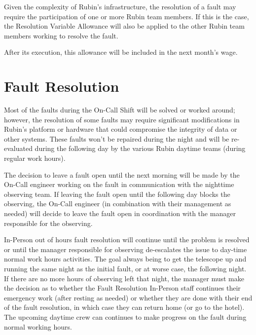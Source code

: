 Given the complexity of Rubin's infrastructure, the resolution of a fault may require the participation of one or more Rubin team members. If this is the case, the Resolution Variable Allowance will also be applied to the other Rubin team members working to resolve the fault.

After its execution, this allowance will be included in the next month's wage.


\section{Fault Resolution}

Most of the faults during the On-Call Shift will be solved or worked around; however, the resolution of some faults may require significant modifications in Rubin's platform or hardware that could compromise the integrity of data or other systems. These faults won't be repaired during the night and will be re-evaluated during the following day by the various Rubin daytime teams (during regular work hours).

The decision to leave a fault open until the next morning will be made by the On-Call engineer working on the fault in communication with the nighttime observing team. If leaving the fault open until the following day blocks the observing, the On-Call engineer (in combination with their management as needed) will decide to leave the fault open in coordination with the manager responsible for the observing.

In-Person out of hours fault resolution will continue until the problem is resolved or until the manager responsible for observing de-escalates the issue to day-time normal work hours activities.  The goal always being to get the telescope up and running the same night as the initial fault, or at worse case, the following night.  If there are no more hours of observing left that night, the manager must make the decision as to whether the Fault Resolution In-Person staff continues their emergency work (after resting as needed) or whether they are done with their end of the fault resolution, in which case they can return home (or go to the hotel).  The upcoming daytime crew can continues to make progress on the fault during normal working hours.



